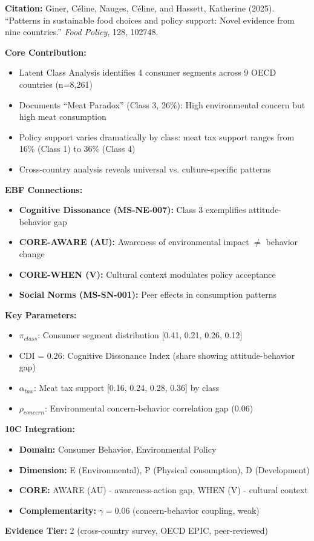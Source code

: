 \begin{tcolorbox}[colback=yellow!5!white,colframe=yellow!75!black,title=Key Paper: Giner, Nauges \& Hassett (2025)]
\textbf{Citation:} Giner, C\'eline, Nauges, C\'eline, and Hassett, Katherine (2025). ``Patterns in sustainable food choices and policy support: Novel evidence from nine countries.'' \textit{Food Policy}, 128, 102748.

\textbf{Core Contribution:}
\begin{itemize}[nosep]
    \item Latent Class Analysis identifies 4 consumer segments across 9 OECD countries (n=8,261)
    \item Documents ``Meat Paradox'' (Class 3, 26\%): High environmental concern but high meat consumption
    \item Policy support varies dramatically by class: meat tax support ranges from 16\% (Class 1) to 36\% (Class 4)
    \item Cross-country analysis reveals universal vs. culture-specific patterns
\end{itemize}

\textbf{EBF Connections:}
\begin{itemize}[nosep]
    \item \textbf{Cognitive Dissonance (MS-NE-007):} Class 3 exemplifies attitude-behavior gap
    \item \textbf{CORE-AWARE (AU):} Awareness of environmental impact $\neq$ behavior change
    \item \textbf{CORE-WHEN (V):} Cultural context modulates policy acceptance
    \item \textbf{Social Norms (MS-SN-001):} Peer effects in consumption patterns
\end{itemize}

\textbf{Key Parameters:}
\begin{itemize}[nosep]
    \item $\pi_{class}$: Consumer segment distribution [0.41, 0.21, 0.26, 0.12]
    \item CDI = 0.26: Cognitive Dissonance Index (share showing attitude-behavior gap)
    \item $\alpha_{tax}$: Meat tax support [0.16, 0.24, 0.28, 0.36] by class
    \item $\rho_{concern}$: Environmental concern-behavior correlation gap (0.06)
\end{itemize}

\textbf{10C Integration:}
\begin{itemize}[nosep]
    \item \textbf{Domain:} Consumer Behavior, Environmental Policy
    \item \textbf{Dimension:} E (Environmental), P (Physical consumption), D (Development)
    \item \textbf{CORE:} AWARE (AU) - awareness-action gap, WHEN (V) - cultural context
    \item \textbf{Complementarity:} $\gamma = 0.06$ (concern-behavior coupling, weak)
\end{itemize}

\textbf{Evidence Tier:} 2 (cross-country survey, OECD EPIC, peer-reviewed)
\end{tcolorbox}

